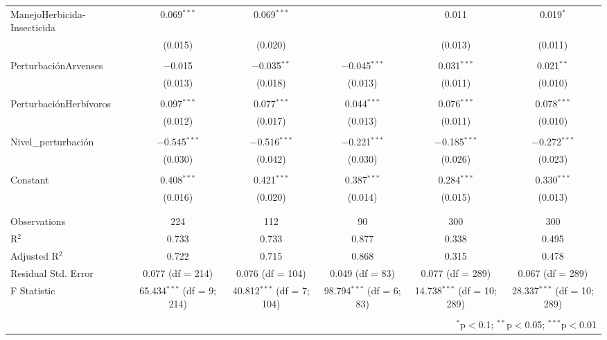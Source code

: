 \documentclass[spanish,11pt]{article}
\begin{document}
\begin{table}[!htbp]
\begin{tabular}{@{\extracolsep{5pt}}lccccc}
 ManejoHerbicida-Insecticida & 0.069$^{***}$ & 0.069$^{***}$ &  & 0.011 & 0.019$^{*}$ \\ 
  & (0.015) & (0.020) &  & (0.013) & (0.011) \\ 
  & & & & & \\ 
 PerturbaciónArvenses & $-$0.015 & $-$0.035$^{**}$ & $-$0.045$^{***}$ & 0.031$^{***}$ & 0.021$^{**}$ \\ 
  & (0.013) & (0.018) & (0.013) & (0.011) & (0.010) \\ 
  & & & & & \\ 
 PerturbaciónHerbívoros & 0.097$^{***}$ & 0.077$^{***}$ & 0.044$^{***}$ & 0.076$^{***}$ & 0.078$^{***}$ \\ 
  & (0.012) & (0.017) & (0.013) & (0.011) & (0.010) \\ 
  & & & & & \\ 
 Nivel\_perturbación & $-$0.545$^{***}$ & $-$0.516$^{***}$ & $-$0.221$^{***}$ & $-$0.185$^{***}$ & $-$0.272$^{***}$ \\ 
  & (0.030) & (0.042) & (0.030) & (0.026) & (0.023) \\ 
  & & & & & \\ 
 Constant & 0.408$^{***}$ & 0.421$^{***}$ & 0.387$^{***}$ & 0.284$^{***}$ & 0.330$^{***}$ \\ 
  & (0.016) & (0.020) & (0.014) & (0.015) & (0.013) \\ 
  & & & & & \\ 
\hline \\[-1.8ex] 
Observations & 224 & 112 & 90 & 300 & 300 \\ 
R$^{2}$ & 0.733 & 0.733 & 0.877 & 0.338 & 0.495 \\ 
Adjusted R$^{2}$ & 0.722 & 0.715 & 0.868 & 0.315 & 0.478 \\ 
Residual Std. Error & 0.077 (df = 214) & 0.076 (df = 104) & 0.049 (df = 83) & 0.077 (df = 289) & 0.067 (df = 289) \\ 
F Statistic & 65.434$^{***}$ (df = 9; 214) & 40.812$^{***}$ (df = 7; 104) & 98.794$^{***}$ (df = 6; 83) & 14.738$^{***}$ (df = 10; 289) & 28.337$^{***}$ (df = 10; 289) \\ 
\hline 
\hline \\[-1.8ex] 
\multicolumn{6}{r}{$^{*}$p$<$0.1; $^{**}$p$<$0.05; $^{***}$p$<$0.01} \\ 
\end{tabular} 
\end{table} 
\end{document}
